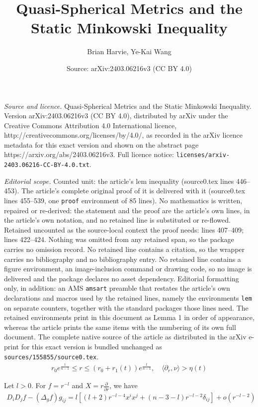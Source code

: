 \documentclass[10pt,a4paper]{amsart}
\title{Quasi-Spherical Metrics and the Static Minkowski Inequality}
\author{Brian Harvie, Ye-Kai Wang}
\date{Source: arXiv:2403.06216v3 (CC BY 4.0)}
\newcommand{\lt}{\left}
\newcommand{\pl}{\partial}
\newcommand{\rt}{\right}
\begin{document}
\maketitle

\noindent\emph{Source and licence.} Quasi-Spherical Metrics and the Static Minkowski Inequality. Version arXiv:2403.06216v3 (CC BY 4.0), distributed by arXiv under the Creative Commons Attribution 4.0 International licence, http://creativecommons.org/licenses/by/4.0/, as recorded in the arXiv licence metadata for this exact version and shown on the abstract page https://arxiv.org/abs/2403.06216v3. Full licence notice: \texttt{licenses/arxiv-2403.06216-CC-BY-4.0.txt}.\par\smallskip

\noindent\textit{Editorial scope.} Counted unit: the article's lem inequality (source0.tex lines 446--453). The article's complete original proof of it is delivered with it (source0.tex lines 455--539, one \texttt{proof} environment of 85 lines). No mathematics is written, repaired or re-derived: the statement and the proof are the article's own lines, in the article's own notation, and no retained line is substituted or re-flowed.  Retained uncounted as the source-local context the proof needs: lines 407--409; lines 422--424.  Nothing was omitted from any retained span, so the package carries no omission record.  No retained line contains a citation, so the wrapper carries no bibliography and no bibliography entry.  No retained line contains a figure environment, an image-inclusion command or drawing code, so no image is delivered and the package declares no asset dependency.  Editorial formatting only, in addition: an AMS \texttt{amsart} preamble that restates the article's own declarations and macros used by the retained lines, namely the environments \texttt{lem} on separate counters, together with the standard packages those lines need.  The retained environments print in this document as Lemma 1 in order of appearance, whereas the article prints the same items with the numbering of its own full document.  The complete native source of the article as distributed in the arXiv e-print for this exact version is bundled unchanged as \texttt{sources/155855/source0.tex}.
\begin{align}\label{C0C1bound}
r_0 e^{\frac{t}{n-1}} \le r \le (r_0 + r_1(t)) e^{\frac{t}{n-1}}, \quad \langle \pl_r ,\nu \rangle > \eta(t)
\end{align}

Let $l > 0$. For $f = r^{-l}$ and $X = r \frac{\pl}{\pl r}$, we have \begin{align}\label{D2f}
D_iD_j f -(\Delta_g f) g_{ij}  = l \lt[ (l+2) r^{-l-4} x^ix^j + (n-3-l) r^{-l-2}\delta_{ij} \rt] + o(r^{-l-2})
\end{align}
\end{document}
